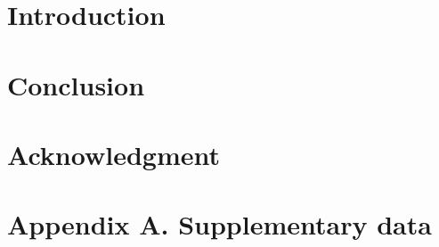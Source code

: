 \documentclass{arxiv-icarus}
\begin{document}

\section{Introduction}







\section{Conclusion}



\clearpage

\section*{Acknowledgment}


\section*{Appendix A. Supplementary data}



\end{document}
